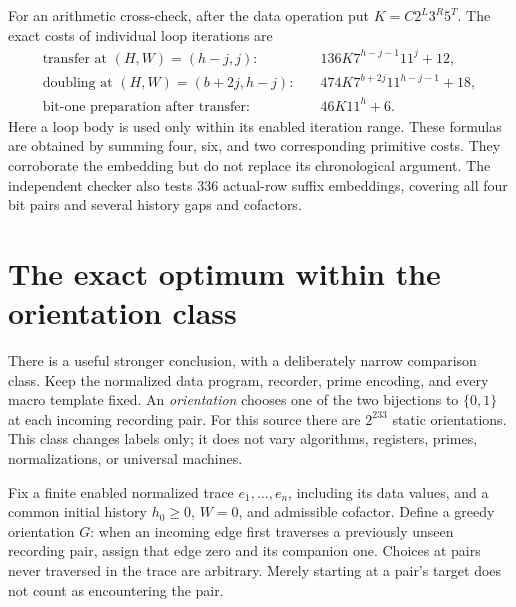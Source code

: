 \documentclass[11pt,a4paper]{article}
\numberwithin{equation}{section}
\begin{document}
For an arithmetic cross-check, after the data operation put
$K=C2^L3^R5^T$. The exact costs of individual loop iterations are
\begin{align*}
\text{transfer at }(H,W)=(h-j,j):
 &\quad136K7^{h-j-1}11^j+12,\\
\text{doubling at }(H,W)=(b+2j,h-j):
 &\quad474K7^{b+2j}11^{h-j-1}+18,\\
\text{bit-one preparation after transfer}:
 &\quad46K11^h+6.
\end{align*}
Here a loop body is used only within its enabled iteration range. These
formulas are obtained by summing four, six, and two corresponding primitive
costs. They corroborate the embedding but do not replace its chronological
argument. The independent checker also tests 336 actual-row suffix embeddings,
covering all four bit pairs and several history gaps and cofactors.

\section{The exact optimum within the orientation class}
\label{fpa:st:sec:optimality}
There is a useful stronger conclusion, with a deliberately narrow comparison
class. Keep the normalized data program, recorder, prime encoding, and every
macro template fixed. An \emph{orientation} chooses one of the two bijections
to $\{0,1\}$ at each incoming recording pair. For this source there are
$2^{233}$ static orientations. This class changes labels only; it does not
vary algorithms, registers, primes, normalizations, or universal machines.

Fix a finite enabled normalized trace $e_1,\ldots,e_n$, including its data
values, and a common initial history $h_0\geq0$, $W=0$, and admissible
cofactor. Define a greedy orientation $G$: when an incoming edge first
traverses a previously unseen recording pair, assign that edge zero and its
companion one. Choices at pairs never traversed in the trace are arbitrary.
Merely starting at a pair's target does not count as encountering the pair.
\end{document}
